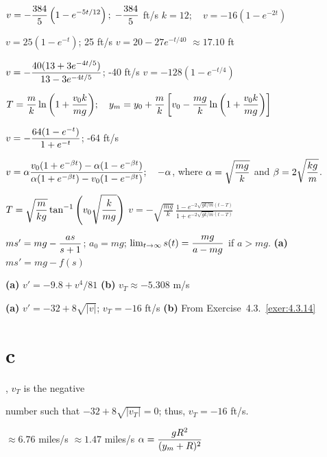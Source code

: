 \medskip

 $v=-\displaystyle\frac{384}{5}\left(1-e^{-5t/12}\right);\;
-\displaystyle\frac{384}{5}$ ft/s
 $k=12;\quad v=-16(1-e^{-2t})$

  $v=25(1-e^{-t})$; 25 ft/s
  $v=20-27e^{-t/40}$
  $\approx17.10$ ft

 $v=-\displaystyle\frac{40(13+3e^{-4t/5})}{13-3e^{-4t/5}}$;   -40 ft/s
  $v=-128(1-e^{-t/4})$

$T=\displaystyle{\frac{m}{k}\ln\left(1+\frac{v_{0}k}{mg}
\right)};\quad y_{m}=y_{0}+\displaystyle{\frac{m}{k}\left[v_{0}-\frac{mg}{k}\ln\left(1+\frac{v_{0}k}{mg}\right)\right]}$

  $v=-\displaystyle\frac{64(1-e^{-t})}{1+e^{-t}}$;
-64 ft/s

$v=\alpha\displaystyle\frac{v_{0}(1+e^{-\beta t})-\alpha(1-e^{-\beta
t})}{\alpha(1+e^{-\beta t})-v_{0}(1-e^{-\beta t})};\quad-\alpha$,
where $\alpha=\displaystyle{\sqrt{\frac{mg}{k}}}$ and
$\beta=2\displaystyle{\sqrt{\frac{kg}{m}}}$.

$\displaystyle{T=\sqrt{\frac{m}{kg}}
\tan^{-1}\left(v_{0}\sqrt{\frac{k}{mg}}\right)}$
$v=-\sqrt{\frac{mg}{k}}\,
\frac{1-e^{-2\sqrt{gk/m}(t-T)}}{1+e^{-2\sqrt{gk/m}
(t-T)}}$

$ms'=mg-\displaystyle\frac{as}{s+1}$;   $a_{0}=mg$; $\lim_{t\to\infty}s(t)=\displaystyle\frac{mg}{a-mg}$ if $a>mg$.
 {\bf (a)} $ms'=mg-f(s)$

{\bf (a)} $v'=-9.8+v^{4}/81$   {\bf (b)}
$v_{T}\approx-5.308$ m/s

{\bf (a)} $v'=-32+8\sqrt{|v|}$;\;  $v_{T}=-16$ ft/s
{\bf (b)} From Exercise~4.3.~\hspace*{-3pt}\ref{exer:4.3.14}\part{c},
$v_{T}$ is the
negative

\quad \quad number such that $-32+8\sqrt{|v_{T}|}=0$; thus, $v_{T}=-16$ ft/s.

  $\approx6.76$ miles/s
  $\approx1.47$ miles/s
  $\alpha=\displaystyle\frac{gR^{2}}{(y_{m}+R)^{2}}$

